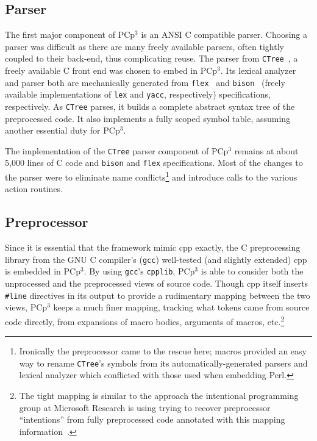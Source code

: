 \documentclass{article}
\newcommand{\pcp}{\mbox{\textsf{PCp}$^3$}}
\newcommand{\Cpp}{\mbox{\textsf{cpp}}}
\newcommand{\Perl}{\mbox{\textsf{Perl}}}
\newcommand{\C}{\mbox{\textsf{C}}}
\newcommand{\ppd}[1]{\texttt{\##1}}
\newcommand{\etc}{etc}  %
\begin{document}
\subsection{Parser}

The first major component of \pcp{} is an ANSI \C{} compatible parser.
Choosing a parser was difficult as there are many freely available
parsers, often tightly coupled to their back-end, thus complicating
reuse.  The parser from \texttt{CTree}~\cite{CTree}, a freely available
\C{} front end was chosen to embed in \pcp{}.  Its lexical analyzer and
parser both are mechanically generated from
\texttt{flex}~\cite{Flex,Levine92} and
\texttt{bison}~\cite{Bison,Levine92} (freely available implementations
of \texttt{lex} and \texttt{yacc}, respectively) specifications,
respectively. As \texttt{CTree} parses, it builds a complete abstract
syntax tree of the preprocessed code.  It also implements a fully scoped symbol table,
assuming another essential duty for \pcp{}.

The implementation of the \texttt{CTree} parser component of \pcp{}
remains at about 5,000 lines of \C{} code and \texttt{bison} and
\texttt{flex} specifications.  Most of the changes to the parser were to
eliminate name conflicts\footnote{Ironically the preprocessor came to the
  rescue here; macros provided an easy way to rename \texttt{CTree}'s
  symbols from its automatically-generated parsers and lexical analyzer
  which conflicted with those used when embedding \Perl{}.}  and
introduce calls to the various action routines.

\subsection{Preprocessor}


Since it is essential that the framework mimic \Cpp{}
exactly, the \C{} preprocessing library from the GNU \C{}
compiler's (\texttt{gcc}) well-tested (and slightly extended)
\Cpp{}~\cite{GCC} is embedded in \pcp{}.  By using \texttt{gcc}'s
\texttt{cpplib}, \pcp{} is able to consider both the unprocessed and
the preprocessed views of source code.  Though \Cpp{} itself inserts
\ppd{line} directives in its output to provide a rudimentary mapping
between the two views, \pcp{} keeps a much finer mapping, tracking
what tokens came from source code directly, from expansions of macro
bodies, arguments of macros, \etc.\footnote{The tight mapping is similar
  to the approach the intentional programming group at Microsoft
  Research is using trying to recover preprocessor ``intentions'' from
  fully preprocessed code annotated with this mapping
  information~\cite{MSIPPersonal}.}
\end{document}
